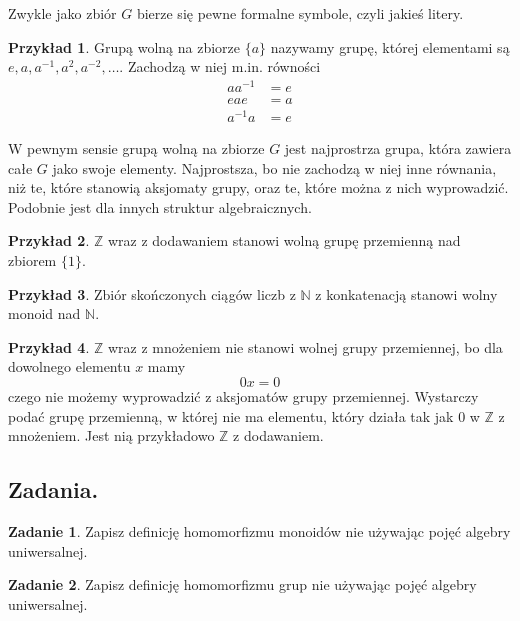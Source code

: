 \documentclass{book}
\theoremstyle{definition}
\newtheorem{example}{Przykład}[section]
\newtheorem{exercise}{Zadanie}[section]
\begin{document}
Zwykle jako zbiór $G$ bierze się pewne formalne symbole, czyli jakieś litery.

\begin{example}
	Grupą wolną na zbiorze $\{a\}$ nazywamy grupę, której elementami są
	$e, a, a^{-1}, a^2, a^{-2}, \dots$.
	Zachodzą w niej m.in. równości
	\begin{align}
		aa^{-1} &= e \\
		eae &= a \\
		a^{-1}a &= e
	\end{align}
\end{example}

W pewnym sensie grupą wolną na zbiorze $G$ jest najprostrza grupa,
	która zawiera całe $G$ jako swoje elementy.
Najprostsza,
	bo nie zachodzą w niej inne równania,
	niż te,
	które stanowią aksjomaty grupy,
	oraz te,
	które można z nich wyprowadzić.
Podobnie jest dla innych struktur algebraicznych.

\begin{example}
	$\mathbb{Z}$ wraz z dodawaniem stanowi wolną grupę przemienną nad zbiorem $\{1\}$.
\end{example}

\begin{example}
	Zbiór skończonych ciągów liczb z $\mathbb{N}$ z konkatenacją stanowi wolny monoid nad $\mathbb{N}$.
\end{example}

\begin{example}
	$\mathbb{Z}$ wraz z mnożeniem nie stanowi wolnej grupy przemiennej,
		bo dla dowolnego elementu $x$ mamy
		\begin{equation}
		0x = 0
		\end{equation}
		czego nie możemy wyprowadzić z aksjomatów grupy przemiennej.
	Wystarczy podać grupę przemienną,
		w której nie ma elementu,
		który działa tak jak $0$ w $\mathbb{Z}$ z mnożeniem.
	Jest nią przykładowo $\mathbb{Z}$ z dodawaniem.
\end{example}

\subsection{Zadania.}

\begin{exercise}
	Zapisz definicję homomorfizmu monoidów nie używając pojęć algebry uniwersalnej.
\end{exercise}

\begin{exercise}
	Zapisz definicję homomorfizmu grup nie używając pojęć algebry uniwersalnej.
\end{exercise}
\end{document}

